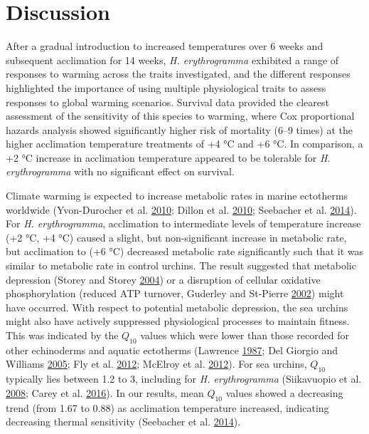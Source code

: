 \documentclass[a4paper,10pt, oneside]{memoir}
\begin{document}
\hypertarget{discussion}{%
\section{Discussion}\label{discussion}}

After a gradual introduction to increased temperatures over 6 weeks and subsequent acclimation for 14 weeks, \emph{H. erythrogramma} exhibited a range of responses to warming across the traits investigated, and the different responses highlighted the importance of using multiple physiological traits to assess responses to global warming scenarios.
Survival data provided the clearest assessment of the sensitivity of this species to warming, where Cox proportional hazards analysis showed significantly higher risk of mortality (6--9 times) at the higher acclimation temperature treatments of +4 °C and +6 °C.
In comparison, a +2 °C increase in acclimation temperature appeared to be tolerable for \emph{H. erythrogramma} with no significant effect on survival.

Climate warming is expected to increase metabolic rates in marine ectotherms worldwide (Yvon-Durocher et al. \protect\hyperlink{ref-Yvon-Durocher2010}{2010}; Dillon et al. \protect\hyperlink{ref-Dillon2010}{2010}; Seebacher et al. \protect\hyperlink{ref-Seebacher2014}{2014}).
For \emph{H. erythrogramma}, acclimation to intermediate levels of temperature increase (+2 °C, +4 °C) caused a slight, but non-significant increase in metabolic rate, but acclimation to (+6 °C) decreased metabolic rate significantly such that it was similar to metabolic rate in control urchins.
The result suggested that metabolic depression (Storey and Storey \protect\hyperlink{ref-Storey2004}{2004}) or a disruption of cellular oxidative phosphorylation (reduced ATP turnover, Guderley and St-Pierre \protect\hyperlink{ref-Guderley2002}{2002}) might have occurred. With respect to potential metabolic depression, the sea urchins might also have actively suppressed physiological processes to maintain fitness.
This was indicated by the \(Q_{10}\) values which were lower than those recorded for other echinoderms and aquatic ectotherms (Lawrence \protect\hyperlink{ref-Lawrence1987}{1987}; Del Giorgio and Williams \protect\hyperlink{ref-DelGiorgio2005}{2005}; Fly et al. \protect\hyperlink{ref-Fly2012}{2012}; McElroy et al. \protect\hyperlink{ref-McElroy2012}{2012}).
For sea urchins, \(Q_{10}\) typically lies between 1.2 to 3, including for \emph{H. erythrogramma} (Siikavuopio et al. \protect\hyperlink{ref-Siikavuopio2008}{2008}; Carey et al. \protect\hyperlink{ref-Carey2016}{2016}).
In our results, mean \(Q_{10}\) values showed a decreasing trend (from 1.67 to 0.88) as acclimation temperature increased, indicating decreasing thermal sensitivity (Seebacher et al. \protect\hyperlink{ref-Seebacher2014}{2014}).
\end{document}
